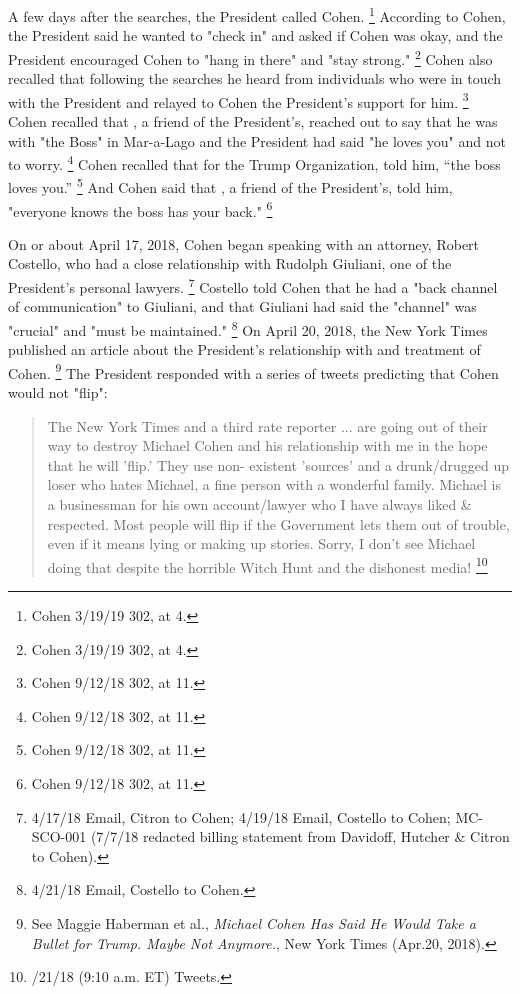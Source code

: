 {A few days after the searches, the President called Cohen.%
\footnote{Cohen 3/19/19 302, at 4.}
According to Cohen, the President said he wanted to "check in" and asked if Cohen was okay, and the President encouraged Cohen to "hang in there" and "stay strong."%
\footnote{Cohen 3/19/19 302, at 4.}
Cohen also recalled that following the searches he heard from individuals who were in touch with the President and relayed to Cohen the President's support for him.%
\footnote{Cohen 9/12/18 302, at 11.}
Cohen recalled that , a friend of the President's, reached out to say that he was with "the Boss" in Mar-a-Lago and the President had said "he loves you" and not to worry.%
\footnote{Cohen 9/12/18 302, at 11.}
Cohen recalled that  for the Trump Organization, told him, ``the boss loves you.''%
\footnote{Cohen 9/12/18 302, at 11.}
And Cohen said that , a friend of the President's, told him, "everyone knows the boss has your back."%
\footnote{Cohen 9/12/18 302, at 11.}

On or about April 17, 2018, Cohen began speaking with an attorney, Robert Costello, who had a close relationship with Rudolph Giuliani, one of the President's personal lawyers.%
\footnote{4/17/18 Email, Citron to Cohen;
4/19/18 Email, Costello to Cohen;
MC-SCO-001 (7/7/18 redacted billing statement from Davidoff, Hutcher \& Citron to Cohen).}
Costello told Cohen that he had a "back channel of communication" to Giuliani, and that Giuliani had said the "channel" was "crucial" and "must be maintained."%
\footnote{4/21/18 Email, Costello to Cohen.}
On April 20, 2018, the New York Times published an article about the President's relationship with and treatment of Cohen.%
\footnote{See Maggie Haberman et al., \textit{Michael Cohen Has Said He Would Take a Bullet for Trump. Maybe Not Anymore.}, New York Times (Apr.20, 2018).}
The President responded with a series of tweets predicting that Cohen would not "flip":

\begin{quote}
The New York Times and a third rate reporter ... are going out of their way to destroy Michael Cohen and his relationship with me in the hope that he will 'flip.'
They use non- existent 'sources' and a drunk/drugged up loser who hates Michael, a fine person with a wonderful family.
Michael is a businessman for his own account/lawyer who I have always liked \& respected.
Most people will flip if the Government lets them out of trouble, even if it means lying or making up stories.
Sorry, I don't see Michael doing that despite the horrible Witch Hunt and the dishonest media!%
\footnote{/21/18 (9:10 a.m. ET) Tweets.}
\end{quote}

}
